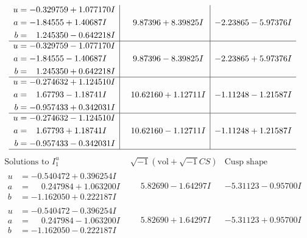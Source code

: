 \documentclass[1p]{elsarticle_modified}
\theoremstyle{definition}
\newcommand{\I}{\sqrt{-1}}
\begin{document}
$$\begin{array}{c|c|c}
\begin{aligned}
u &= -0.329759 + 1.077170 I \\
a &= -1.84555 + 1.40687 I \\
b &= \phantom{-}1.245350 - 0.642218 I\end{aligned}
 & \phantom{-}9.87396 + 8.39825 I & -2.23865 - 5.97376 I \\ \hline\begin{aligned}
u &= -0.329759 - 1.077170 I \\
a &= -1.84555 - 1.40687 I \\
b &= \phantom{-}1.245350 + 0.642218 I\end{aligned}
 & \phantom{-}9.87396 - 8.39825 I & -2.23865 + 5.97376 I \\ \hline\begin{aligned}
u &= -0.274632 + 1.124510 I \\
a &= \phantom{-}1.67793 - 1.18741 I \\
b &= -0.957433 + 0.342031 I\end{aligned}
 & \phantom{-}10.62160 + 1.12711 I & -1.11248 - 1.21587 I \\ \hline\begin{aligned}
u &= -0.274632 - 1.124510 I \\
a &= \phantom{-}1.67793 + 1.18741 I \\
b &= -0.957433 - 0.342031 I\end{aligned}
 & \phantom{-}10.62160 - 1.12711 I & -1.11248 + 1.21587 I\\
 \hline 
 \end{array}$$\newpage$$\begin{array}{c|c|c}  
\text{Solutions to }I^u_{1}& \I (\text{vol} + \sqrt{-1}CS) & \text{Cusp shape}\\
 \hline 
\begin{aligned}
u &= -0.540472 + 0.396254 I \\
a &= \phantom{-}0.247984 + 1.063200 I \\
b &= -1.162050 + 0.222187 I\end{aligned}
 & \phantom{-}5.82690 - 1.64297 I & -5.31123 - 0.95700 I \\ \hline\begin{aligned}
u &= -0.540472 - 0.396254 I \\
a &= \phantom{-}0.247984 - 1.063200 I \\
b &= -1.162050 - 0.222187 I\end{aligned}
 & \phantom{-}5.82690 + 1.64297 I & -5.31123 + 0.95700 I \\ \hline\begin{aligned}

\end{aligned}
\end{array}$$
\end{document}
